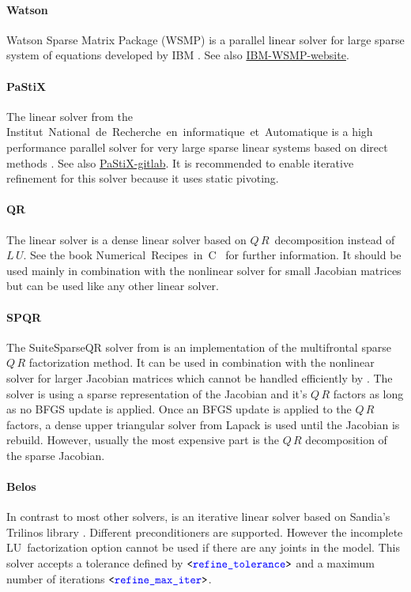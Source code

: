 \paragraph{Watson}
Watson Sparse Matrix Package (WSMP) is a parallel linear solver for large sparse system of equations developed by IBM \cite{10.1145/569147.569149}.
See also \href{https://researcher.watson.ibm.com/researcher/view_group.php?id=1426}{IBM-WSMP-website}.

\paragraph{PaStiX}
The  linear solver from the Institut~National~de~Recherche~en~informatique~et~Automatique
is a high performance parallel solver for very large sparse linear systems based on direct methods \cite{henon:inria-00346017}.
See also \href{https://gitlab.inria.fr/solverstack/pastix}{PaStiX-gitlab}.
It is recommended to enable iterative refinement for this solver because it uses static pivoting.

\paragraph{QR}
The  linear solver is a dense linear solver based on $Q\,R$~decomposition instead of $L\,U$.
See the book Numerical~Recipes~in~{C}~\cite{NUMERICAL-RECIPES-IN-C} for further information.
It should be used mainly in combination with the  nonlinear solver for small Jacobian
matrices but can be used like any other linear solver.

\paragraph{SPQR}
The SuiteSparseQR solver  from \cite{SUITESPARSE-QR-2011} is an implementation
of the multifrontal sparse $Q\,R$ factorization method. It can be used in combination
with the  nonlinear solver for larger Jacobian matrices which cannot be
handled efficiently by . The  solver is using a sparse representation
of the Jacobian and it's $Q\,R$ factors as long as no BFGS update is applied.
Once an BFGS update is applied to the $Q\,R$ factors, a dense upper triangular solver
from Lapack is used until the Jacobian is rebuild. However, usually the most expensive
part is the $Q\,R$ decomposition of the sparse Jacobian.

\paragraph{Belos}
In contrast to most other solvers,  is an iterative linear solver based on
Sandia's Trilinos library \cite{TRILINOS-WEBSITE}. Different preconditioners are supported.
However the incomplete LU~factorization option  cannot be used if there are any
joints in the model. This solver accepts a tolerance defined by $\texttt{<\textcolor{blue}{refine\_tolerance}>}$ and
a maximum number of iterations $\texttt{<\textcolor{blue}{refine\_max\_iter}>}$.

